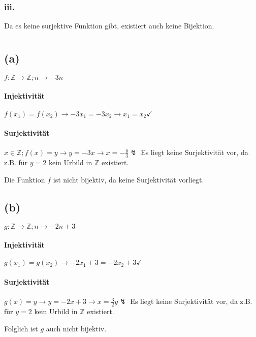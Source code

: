 \documentclass[11pt,a4paper]{article}
\begin{document}
\subsubsection{iii.}
Da es keine surjektive Funktion gibt, existiert auch keine Bijektion.


\section{}

\subsection{(a)}
$f : \mathbb{Z} \rightarrow \mathbb{Z}; n \rightarrow -3n$

\paragraph{Injektivität}
$f(x_1) = f(x_2) \rightarrow -3x_1 = -3x_2 \rightarrow x_1 = x_2 \checkmark$

\paragraph{Surjektivität}
$x \in \mathbb{Z}; f(x) = y \rightarrow y = -3x \rightarrow x = -\frac{y}{3} \lightning$
Es liegt keine Surjektivität vor, da z.B. für $y = 2$ kein Urbild in $\mathbb{Z}$ existiert.

Die Funktion $f$ ist nicht bijektiv, da keine Surjektivität vorliegt.

\subsection{(b)}
$g : \mathbb{Z} \rightarrow \mathbb{Z}; n \rightarrow -2n+3$

\paragraph{Injektivität}
$g(x_1) = g(x_2) \rightarrow -2x_1+3 = -2x_2+3 \checkmark$

\paragraph{Surjektivität}
$g(x) = y \rightarrow y = -2x+3 \rightarrow x = \frac{3}{2}y \lightning$
Es liegt keine Surjektivität vor, da z.B. für $y = 2$ kein Urbild in $\mathbb{Z}$ existiert.

Folglich ist $g$ auch nicht bijektiv.
\end{document}

